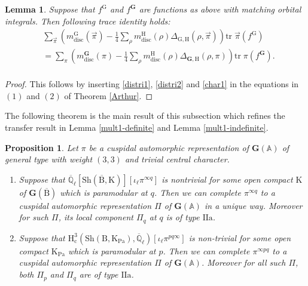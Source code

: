 \documentclass[10pt]{amsart}
\numberwithin{equation}{section}
\newtheorem{lemma}[equation]{Lemma}
\newtheorem{proposition}[equation]{Proposition}
\theoremstyle{definition}
\def\Pa{\mathrm{Pa}}
\def\bfG{\mathbf{G}}
\def\QQ{\mathbb{Q}}
\def\rma{\mathrm{a}}
\def\rmc{\mathrm{c}}
\def\rmB{\mathrm{B}}
\def\rmG{\mathrm{G}}
\def\rmH{\mathrm{H}}
\def\rmI{\mathrm{I}}
\def\rmK{\mathrm{K}}
\def\Sh{\mathrm{Sh}}
\begin{document}
\begin{lemma}\label{first-trace-id}
Suppose that $f^{\rmG}$ and $f^{\bfG}$ are functions as above with matching orbital integrals. Then following trace identity holds:
\begin{equation*}
\begin{aligned}
&\sum\limits_{\vec{\pi}} (m^{\rmG}_{\mathrm{disc}}(\vec{\pi})-\frac{1}{4}\sum\limits_{\rho}m^{\rmH}_{\mathrm{disc}}(\rho)\Delta_{\rmG, \rmH}(\rho, \vec{\pi}))\mathrm{tr}\phantom{.}\vec{\pi}(f^{\rmG})\\
&=\sum\limits_{\pi} (m^{\bfG}_{\mathrm{disc}}(\pi)-\frac{1}{4}\sum\limits_{\rho}m^{\rmH}_{\mathrm{disc}}(\rho)\Delta_{\bfG, \rmH}(\rho,\pi))\mathrm{tr}\phantom{.}{\pi}(f^{\bfG}).\\
\end{aligned}
\end{equation*}
\end{lemma}
\begin{proof}
This follows by inserting \eqref{distri1}, \eqref{distri2} and \eqref{char1} in the equations in $(1)$ and $(2)$ of  Theorem \ref{Arthur}.
\end{proof}

The following theorem is the main result of this subsection which refines the transfer result in Lemma \ref{mult1-definite} and Lemma \ref{mult1-indefinite}.
\begin{proposition}\label{JL}
Let $\pi$ be a cuspidal automorphic representation of $\bfG(\mathbb{A})$ of general type with weight $(3,3)$ and trivial central character. 
\begin{enumerate}
\item Suppose that $\overline{\QQ}_{\ell}[\Sh(\overline{\rmB}, \rmK)][\iota_{\ell}\pi^{\infty q}]$ is nontrivial for some open compact $\rmK$ of $\bfG(\overline{\rmB})$ which is paramodular at $q$. Then we can complete $\pi^{\infty q}$ to a cuspidal automorphic representation $\Pi$ of $\bfG(\mathbb{A})$ in a unique way. Moreover  for such $\Pi$, its local component $\Pi_{q}$ at $q$ is of type $\rmI\rmI\rma$. 
\item Suppose that $\rmH^{3}_{\rmc}(\Sh(\rmB, \rmK_{\Pa}), \overline{\QQ}_{\ell})[\iota_{\ell}\pi^{pq\infty}]$ is non-trivial for some open compact $\rmK_{\Pa}$ which is paramodular at $p$. Then we can complete $\pi^{\infty pq}$ to a cuspidal automorphic representation $\Pi$ of $\bfG(\mathbb{A})$. Moreover  for all such $\Pi$, both $\Pi_{p}$ and $\Pi_{q}$ are of type $\rmI\rmI\rma$. 
\end{enumerate}
\end{proposition}
\end{document}
